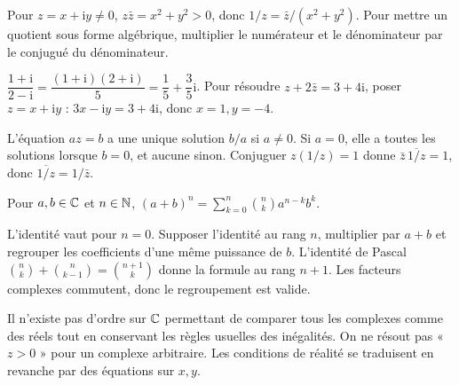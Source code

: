 Pour $z=x+\mathrm iy\ne0$, $z\bar z=x^2+y^2>0$, donc
$1/z=\bar z/(x^2+y^2)$.
Pour mettre un quotient sous forme algébrique, multiplier le numérateur et le dénominateur par le conjugué du dénominateur.
\begin{exemple}
$\dfrac{1+\mathrm i}{2-\mathrm i}=\dfrac{(1+\mathrm i)(2+\mathrm i)}5=\dfrac15+\dfrac35\mathrm i$.
Pour résoudre $z+2\bar z=3+4\mathrm i$, poser $z=x+\mathrm iy$ : $3x-\mathrm iy=3+4\mathrm i$, donc $x=1,y=-4$.
\end{exemple}
L'équation $az=b$ a une unique solution $b/a$ si $a\ne0$. Si $a=0$, elle a toutes les solutions lorsque $b=0$, et aucune sinon.
Conjuguer $z(1/z)=1$ donne $\bar z\,\overline{1/z}=1$, donc $\overline{1/z}=1/\bar z$.
\begin{theoreme}
Pour $a,b\in\mathbb{C}$ et $n\in\mathbb{N}$,
$\displaystyle(a+b)^n=\sum_{k=0}^n\binom nk a^{n-k}b^k$.
\end{theoreme}
\begin{demonstration}
L'identité vaut pour $n=0$. Supposer l'identité au rang $n$, multiplier par $a+b$ et regrouper les coefficients d'une même puissance de $b$. L'identité de Pascal $\binom nk+\binom n{k-1}=\binom{n+1}k$ donne la formule au rang $n+1$. Les facteurs complexes commutent, donc le regroupement est valide.
\end{demonstration}
\begin{attention}
Il n'existe pas d'ordre sur $\mathbb{C}$ permettant de comparer tous les complexes comme des réels tout en conservant les règles usuelles des inégalités. On ne résout pas « $z>0$ » pour un complexe arbitraire. Les conditions de réalité se traduisent en revanche par des équations sur $x,y$.
\end{attention}

